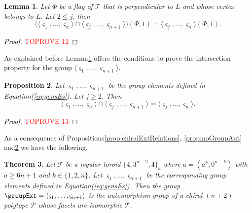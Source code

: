 \documentclass[final]{amsart}
\theoremstyle{plain}
\newtheorem{thm}{Theorem}[section]
\newtheorem{lem}[thm]{Lemma}
\newtheorem{prop}[thm]{Proposition}
\theoremstyle{definition}
\theoremstyle{remark}
\numberwithin{equation}{section}
\renewcommand{\leq}{\leqslant} \renewcommand{\geq}{\geqslant}
\renewcommand{\{}{\lbrace}
\renewcommand{\}}{\rbrace}
\newcommand{\cP}{\mathcal{P}}
\newcommand{\cT}{\mathcal{T}}
\newcommand{\cyvec}[1]{{\mathrm{#1}}}
\newcommand{\va}{\cyvec{a}}
\newcommand{\typetor}[1][n-2]{\{4,3^{#1},4\}}
\newcommand{\es}{\varsigma}
\begin{document}
\begin{lem}\label{lem:IP_orbitsSmallj}
  Let $\Phi$ be a flag of $\cT$ that is perpendicular to $L$ and whose vertex belongs to $L$. Let $2\leq j$, then
  \begin{equation}\label{eq:IP_orbits}
    \big(\langle \es_{1}, \dots, \es_{n} \rangle  \cap \langle \es_{j}, \dots, \es_{n+1} \rangle \big) (\Phi,1) = \langle \es_{j}, \dots, \es_{n} \rangle(\Phi, 1).
  \end{equation}
\end{lem}
\begin{proof}\textcolor{red}{TOPROVE 12}\end{proof}

As explained before Lemma\nobreakspace \ref {lem:IP_orbitsSmallj} offers the conditions to prove the intersection property for the group $\langle \es_{1}, \dots, \es_{n+1} \rangle$.

\begin{prop}\label{prop:IntersectionPropertyExtension} 
  Let $\es_{1}, \dots, \es_{n+1}$ be the group elements defined in Equation\nobreakspace \textup {(\ref {eq:gensEs})}. Let $j \geq 2$. Then
  \begin{equation}\label{eq:IP_groups}
    \langle \es_{1}, \dots, \es_{n} \rangle  \cap \langle \es_{j}, \dots, \es_{n+1} \rangle  = \langle \es_{j}, \dots, \es_{n} \rangle.
  \end{equation}
\end{prop}


\begin{proof}\textcolor{red}{TOPROVE 13}\end{proof}



As a consequence of  Propositions\nobreakspace \ref {prop:chiralExtRelations},  \ref {prop:noGroupAut} and\nobreakspace  \ref {prop:IntersectionPropertyExtension} we have the following.



\begin{thm}\label{thm:elChido}
Let $\cT$ be a regular toroid $\typetor_{\va}$ where $\va = (a^{k}, 0^{n-k})$ with $a \geq 6n +1$ and $k \in \{1,2,n\}$.
Let $\es_{1}, \dots, \es_{n+1}$ be the corresponding group elements defined in Equation\nobreakspace \textup {(\ref {eq:gensEs})}. Then the group $\groupExt = \langle \es_{1}, \dots, \es_{n+1} \rangle$ is the automorphism group of a chiral $(n+2)$-polytope $\cP$ whose facets are isomorphic $\cT$.
\end{thm}
\end{document}

